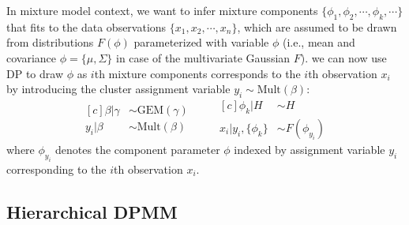 \documentclass{article}
\begin{document}
In mixture model context, we want to infer mixture components $\{\phi_{1}, \phi_{2}, \cdots, \phi_{k}, \cdots\}$ that fits to the data observations $\{x_{1}, x_{2}, \cdots, x_{n}\}$, which are assumed to be drawn from distributions $F(\phi)$ parameterized with variable $\phi$ (i.e., mean and covariance $\phi = \{\mu, \Sigma\}$ in case of the multivariate Gaussian $F$). we can now use DP to draw $\phi$ as $i$th mixture components corresponds to the $i$th observation $x_{i}$ by introducing the cluster assignment variable $y_{i} \sim \text{Mult}(\beta)$:
\begin{equation}\label{eq:dpmm}
\begin{aligned}[c]
    \beta|\gamma &\sim \text{GEM}(\gamma) \\
    y_{i}|\beta &\sim \text{Mult}(\beta)
\end{aligned}
\qquad
\begin{aligned}[c]
    \phi_{k}|H &\sim H \\
    x_{i}|y_{i},\{\phi_{k}\} &\sim F(\phi_{y_{i}}) 
\end{aligned}
\end{equation}
where $\phi_{y_{i}}$ denotes the component parameter $\phi$ indexed by assignment variable $y_{i}$ corresponding to the $i$th observation $x_{i}$.

\subsection{Hierarchical DPMM}\label{sec:hdpgmm:hdpmm}
\end{document}
